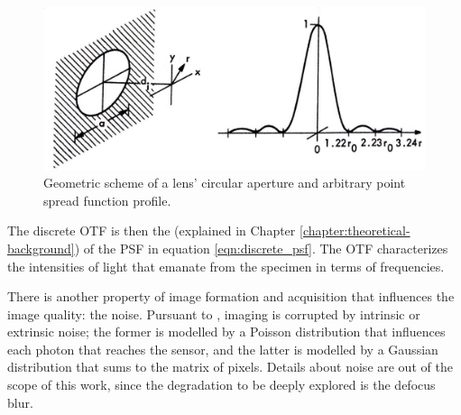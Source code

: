 \begin{figure}[htb]
	\centering
	\caption{\label{fig:discrete_psf_scheme} Geometric scheme of a lens' circular aperture and arbitrary point spread function profile.} 
	\begin{center}
	    \includegraphics[scale=0.35]{images/discrete_psf_scheme.jpeg}
	\end{center}
	\centering
\end{figure}

The discrete OTF is then the  (explained in Chapter \ref{chapter:theoretical-background}) of the PSF in equation \ref{eqn:discrete_psf}. The OTF characterizes the intensities of light that emanate from the specimen in terms of frequencies. 

There is another property of image formation and acquisition that influences the image quality: the noise. Pursuant to , imaging is corrupted by intrinsic or extrinsic noise; the former is modelled by a Poisson distribution that influences each photon that reaches the sensor, and the latter is modelled by a Gaussian distribution that sums to the matrix of pixels. Details about noise are out of the scope of this work, since the degradation to be deeply explored is the defocus blur.